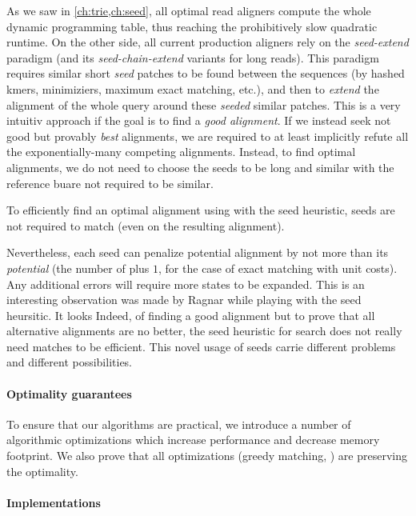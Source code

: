 As we saw in \cref{ch:trie,ch:seed}, all optimal read aligners compute the whole
dynamic programming table, thus reaching the prohibitively slow quadratic
runtime. On the other side, all current production aligners rely on the
\emph{seed-extend} paradigm (and its \emph{seed-chain-extend} variants for long
reads).
%
This paradigm requires similar short \emph{seed} patches to be found
between the sequences (\AG by hashed kmers, minimiziers, maximum exact matching,
etc.), and then to \emph{extend} the alignment of the whole query around these
\emph{seeded} similar patches. This is a very intuitiv approach if the goal is
to find a \emph{good alignment}.
%
If we instead seek not good but provably \emph{best} alignments, we are required
to at least implicitly refute all the exponentially-many competing alignments.
%
Instead, to find optimal alignments, we do not need to choose the seeds to be
long and similar with the reference buare not required to be similar.
%
\begin{observation}
    To efficiently find an optimal alignment using \A with the seed heuristic,
    seeds are not required to match (even on the resulting alignment).
\end{observation}
%
Nevertheless, each seed can penalize potential alignment by not more than its
\emph{potential} (\ie the number of plus $1$, for the case of exact matching
with unit costs). Any additional errors will require more states to be expanded.
%
This is an interesting observation was made by Ragnar while playing with the
seed heursitic. It looks Indeed, of finding a good alignment but to prove that all
alternative alignments are no better, the seed heuristic for \A search does not
really need matches to be efficient.
%
This novel usage of seeds carrie different problems and different possibilities.

\paragraph{Optimality guarantees}
To ensure that our algorithms are practical, we introduce a number of
algorithmic optimizations which increase performance and decrease memory
footprint.
%
We also prove that all optimizations (greedy matching, ) are preserving the optimality.

\paragraph{Implementations}




